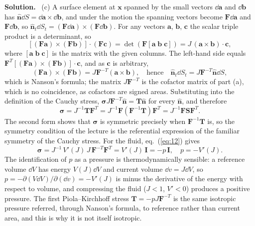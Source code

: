\documentclass[a4paper,12pt]{paper}
\newenvironment{solution}{\par\noindent\textbf{Solution.}\ }{\par\medskip}
\begin{document}
\begin{solution}
(c) A surface element at $\mathbf{x}$ spanned by the small vectors $\dd\mathbf{a}$ and $\dd\mathbf{b}$
has $\hat{\mathbf{n}}\dd S=\dd\mathbf{a}\times\dd\mathbf{b}$, and under the motion the spanning
vectors become $\mathbf{F}\dd\mathbf{a}$ and $\mathbf{F}\dd\mathbf{b}$, so
$\hat{\mathbf{n}}_{t}\dd S_{t}=(\mathbf{F}\dd\mathbf{a})\times(\mathbf{F}\dd\mathbf{b})$. For any
vectors $\mathbf{a}$, $\mathbf{b}$, $\mathbf{c}$ the scalar triple product is a determinant, so
\begin{equation}
\left[(\mathbf{F}\mathbf{a})\times(\mathbf{F}\mathbf{b})\right]\cdot(\mathbf{F}\mathbf{c})
=\det\left(\mathbf{F}\left[\mathbf{a}\;\mathbf{b}\;\mathbf{c}\right]\right)
=J\,(\mathbf{a}\times\mathbf{b})\cdot\mathbf{c},
\label{eq:13}
\end{equation}
where $[\mathbf{a}\;\mathbf{b}\;\mathbf{c}]$ is the matrix with the given columns. The left-hand
side equals $\mathbf{F}^{T}[(\mathbf{F}\mathbf{a})\times(\mathbf{F}\mathbf{b})]\cdot\mathbf{c}$, and
as $\mathbf{c}$ is arbitrary,
\begin{equation}
(\mathbf{F}\mathbf{a})\times(\mathbf{F}\mathbf{b})=J\mathbf{F}^{-T}(\mathbf{a}\times\mathbf{b}),
\quad\text{hence}\quad
\hat{\mathbf{n}}_{t}\dd S_{t}=J\mathbf{F}^{-T}\hat{\mathbf{n}}\dd S,
\label{eq:14}
\end{equation}
which is Nanson's formula; the matrix $J\mathbf{F}^{-T}$ is the cofactor matrix of part (a), which
is no coincidence, as cofactors are signed areas. Substituting into the definition of the Cauchy
stress, $\bm{\sigma}J\mathbf{F}^{-T}\hat{\mathbf{n}}=\mathbf{T}\hat{\mathbf{n}}$ for every
$\hat{\mathbf{n}}$, and therefore
\begin{equation}
\bm{\sigma}=J^{-1}\mathbf{T}\mathbf{F}^{T}=J^{-1}\mathbf{F}\left(\mathbf{F}^{-1}\mathbf{T}\right)\mathbf{F}^{T}
=J^{-1}\mathbf{F}\mathbf{S}\mathbf{F}^{T}.
\label{eq:15}
\end{equation}
The second form shows that $\bm{\sigma}$ is symmetric precisely when $\mathbf{F}^{-1}\mathbf{T}$ is,
so the symmetry condition of the lecture is the referential expression of the familiar symmetry
of the Cauchy stress. For the fluid, eq.~(\ref{eq:12}) gives
\begin{equation}
\bm{\sigma}=J^{-1}\,V'(J)\,J\,\mathbf{F}^{-T}\mathbf{F}^{T}=V'(J)\,\mathbf{I}=-p\,\mathbf{I},\quad p=-V'(J).
\label{eq:16}
\end{equation}
The identification of $p$ as a pressure is thermodynamically sensible: a reference volume
$\dd V$ has energy $V(J)\dd V$ and current volume $\dd v=J\dd V$, so
$p=-\partial(V\dd V)/\partial(\dd v)=-V'(J)$ is minus the derivative of the energy with respect to
volume, and compressing the fluid ($J<1$, $V'<0$) produces a positive pressure. The first
Piola--Kirchhoff stress $\mathbf{T}=-pJ\mathbf{F}^{-T}$ is the same isotropic pressure referred,
through Nanson's formula, to reference rather than current area, and this is why it is not itself
isotropic.


\end{solution}
\end{document}
